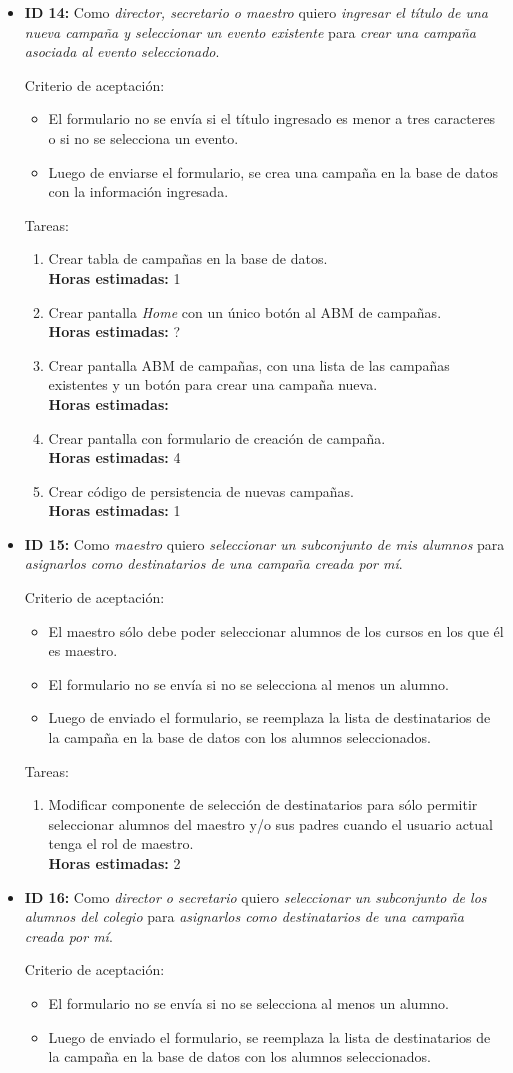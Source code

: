 \documentclass[a4paper, 10pt, twoside]{article}
\newenvironment{stories}{
  \begin{itemize}
}{
  \end{itemize}
}
\newcommand{\storyid}[4]{
  \item
  \textbf{ID #1:} Como \emph{#2} quiero \emph{#3} para \emph{#4}.
}
\newenvironment{tasks}{
  Tareas:
  \begin{enumerate}
}{
  \end{enumerate}
}
\newcommand{\task}[1] {
  \item #1.\\
  \textbf{Horas estimadas:}
}
\newenvironment{criterios}{
  Criterio de aceptación:
  \begin{itemize}
}{
  \end{itemize}
}
\newcommand{\criteria}[1] {
  \item #1
}
\begin{document}
\begin{stories}
  \storyid{14}
          {director, secretario o maestro}
          {ingresar el título de una nueva campaña y seleccionar un evento existente}
          {crear una campaña asociada al evento seleccionado}

   \begin{criterios}
     \criteria{El formulario no se envía si el título ingresado es menor a tres caracteres o si no se selecciona un evento.}
     \criteria{Luego de enviarse el formulario, se crea una campaña en la base de datos con la información ingresada.}
  \end{criterios}

  \begin{tasks}
    \task{Crear tabla de campañas en la base de datos} 1
    \task{Crear pantalla \emph{Home} con un único botón al ABM de campañas} ?
    \task{Crear pantalla ABM de campañas, con una lista de las campañas existentes y un botón para crear una campaña nueva}
    \task{Crear pantalla con formulario de creación de campaña} 4
    \task{Crear código de persistencia de nuevas campañas} 1
  \end{tasks}


  \storyid{15}
          {maestro}
          {seleccionar un subconjunto de mis alumnos}
          {asignarlos como destinatarios de una campaña creada por mí}

   \begin{criterios}
    \criteria{El maestro sólo debe poder seleccionar alumnos de los cursos en los que él es maestro.}
    \criteria{El formulario no se envía si no se selecciona al menos un alumno.}
    \criteria{Luego de enviado el formulario, se reemplaza la lista de destinatarios de la campaña en la base de datos con los alumnos seleccionados.}
  \end{criterios}

  \begin{tasks}
    \task{Modificar componente de selección de destinatarios para sólo permitir seleccionar alumnos del maestro y/o sus padres cuando el usuario actual tenga el rol de maestro} 2
  \end{tasks}


  \storyid{16}
          {director o secretario}
          {seleccionar un subconjunto de los alumnos del colegio}
          {asignarlos como destinatarios de una campaña creada por mí}

  \begin{criterios}
    \criteria{El formulario no se envía si no se selecciona al menos un alumno.}
    \criteria{Luego de enviado el formulario, se reemplaza la lista de destinatarios de la campaña en la base de datos con los alumnos seleccionados.}
  \end{criterios}


\end{stories}
\end{document}
